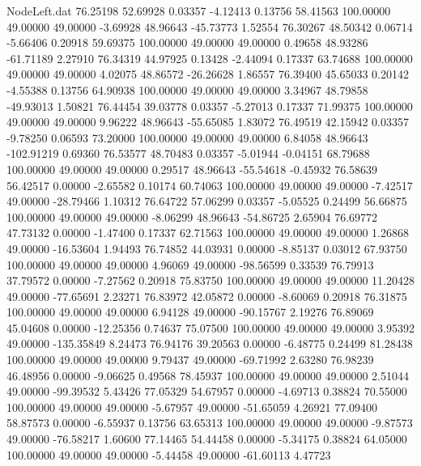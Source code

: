 \begin{filecontents}{NodeLeft.dat}
  76.25198   52.69928    0.03357    -4.12413    0.13756   58.41563  100.00000   49.00000   49.00000   -3.69928   48.96643  -45.73773    1.52554
  76.30267   48.50342    0.06714    -5.66406    0.20918   59.69375  100.00000   49.00000   49.00000    0.49658   48.93286  -61.71189    2.27910
  76.34319   44.97925    0.13428    -2.44094    0.17337   63.74688  100.00000   49.00000   49.00000    4.02075   48.86572  -26.26628    1.86557
  76.39400   45.65033    0.20142    -4.55388    0.13756   64.90938  100.00000   49.00000   49.00000    3.34967   48.79858  -49.93013    1.50821
  76.44454   39.03778    0.03357    -5.27013    0.17337   71.99375  100.00000   49.00000   49.00000    9.96222   48.96643  -55.65085    1.83072
  76.49519   42.15942    0.03357    -9.78250    0.06593   73.20000  100.00000   49.00000   49.00000    6.84058   48.96643 -102.91219    0.69360
  76.53577   48.70483    0.03357    -5.01944   -0.04151   68.79688  100.00000   49.00000   49.00000    0.29517   48.96643  -55.54618   -0.45932
  76.58639   56.42517    0.00000    -2.65582    0.10174   60.74063  100.00000   49.00000   49.00000   -7.42517   49.00000  -28.79466    1.10312
  76.64722   57.06299    0.03357    -5.05525    0.24499   56.66875  100.00000   49.00000   49.00000   -8.06299   48.96643  -54.86725    2.65904
  76.69772   47.73132    0.00000    -1.47400    0.17337   62.71563  100.00000   49.00000   49.00000    1.26868   49.00000  -16.53604    1.94493
  76.74852   44.03931    0.00000    -8.85137    0.03012   67.93750  100.00000   49.00000   49.00000    4.96069   49.00000  -98.56599    0.33539
  76.79913   37.79572    0.00000    -7.27562    0.20918   75.83750  100.00000   49.00000   49.00000   11.20428   49.00000  -77.65691    2.23271
  76.83972   42.05872    0.00000    -8.60069    0.20918   76.31875  100.00000   49.00000   49.00000    6.94128   49.00000  -90.15767    2.19276
  76.89069   45.04608    0.00000   -12.25356    0.74637   75.07500  100.00000   49.00000   49.00000    3.95392   49.00000 -135.35849    8.24473
  76.94176   39.20563    0.00000    -6.48775    0.24499   81.28438  100.00000   49.00000   49.00000    9.79437   49.00000  -69.71992    2.63280
  76.98239   46.48956    0.00000    -9.06625    0.49568   78.45937  100.00000   49.00000   49.00000    2.51044   49.00000  -99.39532    5.43426
  77.05329   54.67957    0.00000    -4.69713    0.38824   70.55000  100.00000   49.00000   49.00000   -5.67957   49.00000  -51.65059    4.26921
  77.09400   58.87573    0.00000    -6.55937    0.13756   63.65313  100.00000   49.00000   49.00000   -9.87573   49.00000  -76.58217    1.60600
  77.14465   54.44458    0.00000    -5.34175    0.38824   64.05000  100.00000   49.00000   49.00000   -5.44458   49.00000  -61.60113    4.47723

\end{filecontents}
